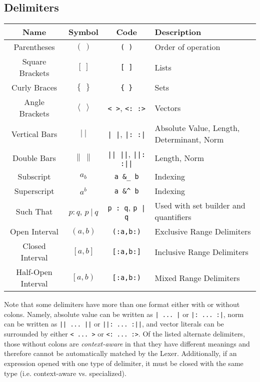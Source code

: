 \documentclass{article}
\begin{document}
  \subsection{Delimiters} %
  \label{sub:delimiters}
  \begin{table}[!h]
    \centering
    \begin{tabular}{|c|c|c|l|}
      \hline
      \textbf{Name} & \textbf{Symbol} & \textbf{Code} & \textbf{Description} \\
      \hline\hline
      Parentheses & \( \left( \ \right) \) & \texttt{( )} & Order of operation \\
      Square Brackets & \( \left[ \ \right] \) & \texttt{[ ]} & Lists \\
      Curly Braces & \( \left\{ \ \right\} \) & \texttt{\{ \}} & Sets \\
      Angle Brackets & \( \left\langle \ \right\rangle \) & \texttt{< >}, \texttt{<: :>} & Vectors \\
      Vertical Bars & \( \left| \ \right| \) & \texttt{| |}, \texttt{|: :|} & Absolute Value, Length, Determinant, Norm \\
      Double Bars & \( \left\| \ \right\| \) & \texttt{|| ||}, \texttt{||: :||} & Length, Norm \\
      \hline
      Subscript & \( a_b \) & \texttt{a \&\_ b} & Indexing \\
      Superscript & \( a^b \) & \texttt{a \&\^{} b} & Indexing \\
      Such That & \( p : q \), \( p ~|~ q \) & \texttt{p : \!\!q}, \texttt{p | q} & Used with set builder and quantifiers \\
      \hline
      Open Interval & \( \left( a,b \right) \) & \texttt{(:a,b:)} & Exclusive Range Delimiters \\
      Closed Interval & \( \left[ a,b \right] \) & \texttt{[:a,b:]} & Inclusive Range Delimiters \\
      Half-Open Interval & \( \left[ a,b \right) \) & \texttt{[:a,b:)} & Mixed Range Delimiters \\
      \hline
    \end{tabular}
  \end{table}
  Note that some delimiters have more than one format either with or without colons. Namely, absolute value can be
  written as \texttt{| ... |} or \texttt{|: ... :|}, norm can be written as \texttt{|| ... ||} or \texttt{||: ... :||},
  and vector literals can be surrounded by either \texttt{< ... >} or \texttt{<: ... :>}. Of the listed alternate
  delimiters, those without colons are \emph{context-aware} in that they have different meanings and therefore cannot be automatically
  matched by the Lexer. Additionally, if an expression opened with one type of delimiter, it must be closed with the
  same type (i.e. context-aware vs. specialized).
\end{document}
